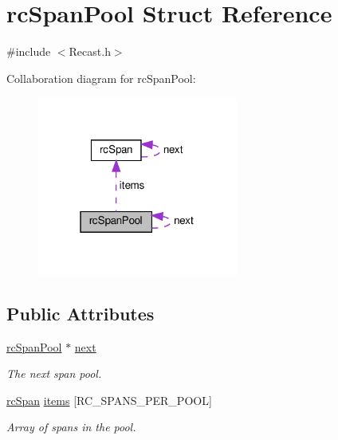\hypertarget{structrcSpanPool}{}\section{rc\+Span\+Pool Struct Reference}
\label{structrcSpanPool}


{\ttfamily \#include $<$Recast.\+h$>$}



Collaboration diagram for rc\+Span\+Pool\+:
\nopagebreak
\begin{figure}[H]
\begin{center}
\leavevmode
\includegraphics[width=187pt]{structrcSpanPool__coll__graph}
\end{center}
\end{figure}
\subsection*{Public Attributes}
\begin{DoxyCompactItemize}
\item 
\mbox{\label{structrcSpanPool_a3b0506b521d7061ce640a938b3f91564}} 
\hyperlink{structrcSpanPool}{rc\+Span\+Pool} $\ast$ \hyperlink{structrcSpanPool_a3b0506b521d7061ce640a938b3f91564}{next}
\begin{DoxyCompactList}\small\item\em The next span pool. \end{DoxyCompactList}\item 
\mbox{\label{structrcSpanPool_ae1de614583ba17e3fb7fc7c6f2f3a829}} 
\hyperlink{structrcSpan}{rc\+Span} \hyperlink{structrcSpanPool_ae1de614583ba17e3fb7fc7c6f2f3a829}{items} \mbox{[}R\+C\+\_\+\+S\+P\+A\+N\+S\+\_\+\+P\+E\+R\+\_\+\+P\+O\+OL\mbox{]}
\begin{DoxyCompactList}\small\item\em Array of spans in the pool. \end{DoxyCompactList}\end{DoxyCompactItemize}


